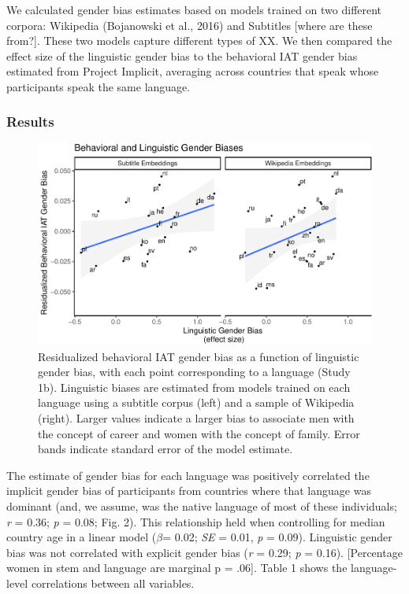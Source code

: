 \documentclass[man,floatsintext]{apa6}
\theoremstyle{definition}
\theoremstyle{definition}
\theoremstyle{definition}
\theoremstyle{remark}
\begin{document}
We calculated gender bias estimates based on models trained on two
different corpora: Wikipedia (Bojanowski et al., 2016) and Subtitles
{[}where are these from?{]}. These two models capture different types of
XX. We then compared the effect size of the linguistic gender bias to
the behavioral IAT gender bias estimated from Project Implicit,
averaging across countries that speak whose participants speak the same
language.

\subsubsection{Results}\label{results}

\begin{figure}
\centering
\includegraphics{iat_lang_files/figure-latex/unnamed-chunk-14-1.pdf}
\caption{\label{fig:unnamed-chunk-14}Residualized behavioral IAT gender bias
as a function of linguistic gender bias, with each point corresponding
to a language (Study 1b). Linguistic biases are estimated from models
trained on each language using a subtitle corpus (left) and a sample of
Wikipedia (right). Larger values indicate a larger bias to associate men
with the concept of career and women with the concept of family. Error
bands indicate standard error of the model estimate.}
\end{figure}

The estimate of gender bias for each language was positively correlated
the implicit gender bias of participants from countries where that
language was dominant (and, we assume, was the native language of most
of these individuals; \emph{r} = 0.36; \emph{p} = 0.08; Fig. 2). This
relationship held when controlling for median country age in a linear
model (\(\beta\)= 0.02; \emph{SE} = 0.01, \emph{p} = 0.09). Linguistic
gender bias was not correlated with explicit gender bias (\emph{r} =
0.29; \emph{p} = 0.16). {[}Percentage women in stem and language are
marginal p = .06{]}. Table 1 shows the language-level correlations
between all variables.
\end{document}
